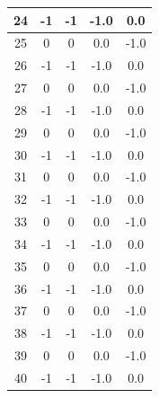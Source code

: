 \documentclass[]{article}
\begin{document}
\begin{table}[!h]
\begin{tabular}{|c|c|c|c|c|}
			24&	 -1 &	 -1 &	 -1.0 &	 0.0 \\ \hline	
			25&	 0 &	 0 &	 0.0 &	 -1.0 \\ \hline	
			26&	 -1 &	 -1 &	 -1.0 &	 0.0 \\ \hline	
			27&	 0 &	 0 &	 0.0 &	 -1.0 \\ \hline	
			28&	 -1 &	 -1 &	 -1.0 &	 0.0 \\ \hline	
			29&	 0 &	 0 &	 0.0 &	 -1.0 \\ \hline	
			30&	 -1 &	 -1 &	 -1.0 &	 0.0 \\ \hline	
			31&	 0 &	 0 &	 0.0 &	 -1.0 \\ \hline	
			32&	 -1 &	 -1 &	 -1.0 &	 0.0 \\ \hline	
			33&	 0 &	 0 &	 0.0 &	 -1.0 \\ \hline	
			34&	 -1 &	 -1 &	 -1.0 &	 0.0 \\ \hline	
			35&	 0 &	 0 &	 0.0 &	 -1.0 \\ \hline	
			36&	 -1 &	 -1 &	 -1.0 &	 0.0 \\ \hline	
			37&	 0 &	 0 &	 0.0 &	 -1.0 \\ \hline	
			38&	 -1 &	 -1 &	 -1.0 &	 0.0 \\ \hline	
			39&	 0 &	 0 &	 0.0 &	 -1.0 \\ \hline	
			40&	 -1 &	 -1 &	 -1.0 &	 0.0 \\ \hline	
		\end{tabular}
	\end{table}
\end{document}
